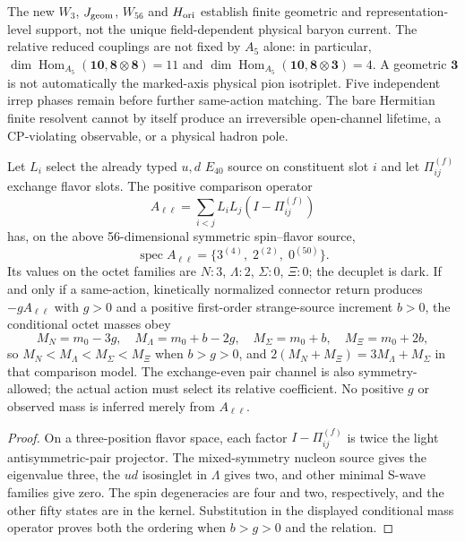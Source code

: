 \documentclass[12pt,a4paper]{article}
\begin{document}
\begin{remark}
\label{p11:rem:v369-five-core-decay-scope}
The new $W_3$, $J_{\rm geom}$, $W_{56}$ and $H_{\rm ori}$ establish
finite geometric and representation-level support, not the unique
field-dependent physical baryon current.  The relative reduced
couplings are not fixed by $A_5$ alone: in particular,
$\dim\operatorname{Hom}_{A_5}(\mathbf{10},\mathbf8\otimes\mathbf8)=11$
and $\dim\operatorname{Hom}_{A_5}(\mathbf{10},\mathbf8\otimes\mathbf3)=4$.
A geometric $\mathbf3$ is not automatically the marked-axis physical
pion isotriplet.  Five independent irrep phases remain before further
same-action matching.  The bare Hermitian finite resolvent cannot by
itself produce an irreversible open-channel lifetime, a CP-violating
observable, or a physical hadron pole.
\end{remark}

\begin{proposition}
\label{p11:prop:v1158-light-pair-conditional-ground-order}
Let $L_i$ select the already typed $u,d$ $E_{40}$ source on
constituent slot $i$ and let $\Pi_{ij}^{(f)}$ exchange flavor slots.
The positive comparison operator
\[
 A_{\ell\ell}=\sum_{i<j}L_iL_j(I-\Pi_{ij}^{(f)})
\]
has, on the above 56-dimensional symmetric spin--flavor source,
\[
 \boxed{\operatorname{spec}A_{\ell\ell}
        =\{3^{(4)},\;2^{(2)},\;0^{(50)}\}.}
\]
Its values on the octet families are $N:3$, $\Lambda:2$,
$\Sigma:0$, $\Xi:0$; the decuplet is dark.  If and only if a
same-action, kinetically normalized connector return produces
$-gA_{\ell\ell}$ with $g>0$ and a positive first-order
strange-source increment $b>0$, the conditional octet masses obey
\[
 M_N=m_0-3g,\quad M_\Lambda=m_0+b-2g,\quad
 M_\Sigma=m_0+b,\quad M_\Xi=m_0+2b,
\]
so $M_N<M_\Lambda<M_\Sigma<M_\Xi$ when $b>g>0$, and
$2(M_N+M_\Xi)=3M_\Lambda+M_\Sigma$ in that comparison model.
The exchange-even pair channel is also symmetry-allowed; the actual
action must select its relative coefficient.  No positive $g$ or
observed mass is inferred merely from $A_{\ell\ell}$.
\end{proposition}
\begin{proof}
On a three-position flavor space, each factor
$I-\Pi_{ij}^{(f)}$ is twice the light antisymmetric-pair
projector.  The mixed-symmetry nucleon source gives the eigenvalue
three, the $ud$ isosinglet in $\Lambda$ gives two,
and other minimal S-wave families give zero.  The spin degeneracies
are four and two, respectively, and the other fifty states are
in the kernel.  Substitution in the displayed conditional mass
operator proves both the ordering when $b>g>0$ and the relation.
\end{proof}
\end{document}
